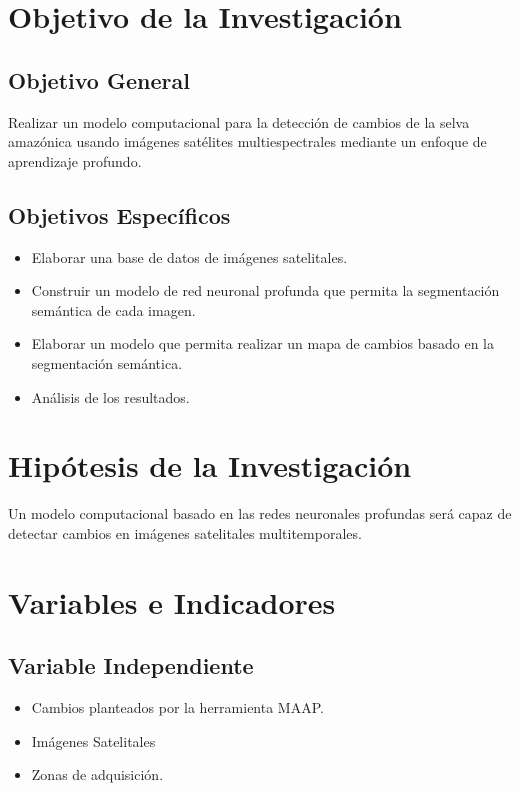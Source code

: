 \section{Objetivo de la Investigación}
\subsection{Objetivo General}
Realizar un modelo computacional para la detección de cambios de la selva amazónica usando imágenes satélites multiespectrales mediante un enfoque de aprendizaje profundo.

\subsection{Objetivos Específicos}
\begin{itemize}[$\circ$]

  \item Elaborar una base de datos de imágenes satelitales.


 \item Construir un modelo de red neuronal profunda que permita la segmentación semántica de cada imagen.

 \item Elaborar un modelo que permita realizar un mapa de cambios basado en la segmentación semántica. 
    \item Análisis de los resultados.
\end{itemize}

\section{Hipótesis de la Investigación}
Un modelo computacional basado en las redes neuronales profundas será capaz de detectar cambios en imágenes satelitales multitemporales.

\section{Variables e Indicadores}
\subsection{Variable Independiente}
\begin{itemize}
    \item  Cambios planteados por la herramienta MAAP.
    \item  Imágenes Satelitales
    \item Zonas de adquisición.
\end{itemize}


